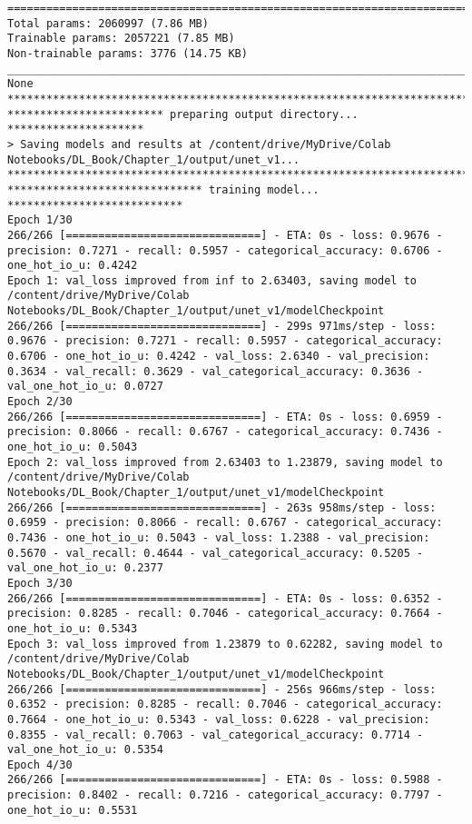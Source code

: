 \documentclass[
  letterpaper,
  DIV=11,
  numbers=noendperiod]{scrreprt}
\begin{document}
\begin{verbatim}
==================================================================================================
Total params: 2060997 (7.86 MB)
Trainable params: 2057221 (7.85 MB)
Non-trainable params: 3776 (14.75 KB)
__________________________________________________________________________________________________
None
****************************************************************************
************************ preparing output directory... *********************
> Saving models and results at /content/drive/MyDrive/Colab Notebooks/DL_Book/Chapter_1/output/unet_v1...
****************************************************************************
****************************** training model... ***************************
Epoch 1/30
266/266 [==============================] - ETA: 0s - loss: 0.9676 - precision: 0.7271 - recall: 0.5957 - categorical_accuracy: 0.6706 - one_hot_io_u: 0.4242
Epoch 1: val_loss improved from inf to 2.63403, saving model to /content/drive/MyDrive/Colab Notebooks/DL_Book/Chapter_1/output/unet_v1/modelCheckpoint
266/266 [==============================] - 299s 971ms/step - loss: 0.9676 - precision: 0.7271 - recall: 0.5957 - categorical_accuracy: 0.6706 - one_hot_io_u: 0.4242 - val_loss: 2.6340 - val_precision: 0.3634 - val_recall: 0.3629 - val_categorical_accuracy: 0.3636 - val_one_hot_io_u: 0.0727
Epoch 2/30
266/266 [==============================] - ETA: 0s - loss: 0.6959 - precision: 0.8066 - recall: 0.6767 - categorical_accuracy: 0.7436 - one_hot_io_u: 0.5043
Epoch 2: val_loss improved from 2.63403 to 1.23879, saving model to /content/drive/MyDrive/Colab Notebooks/DL_Book/Chapter_1/output/unet_v1/modelCheckpoint
266/266 [==============================] - 263s 958ms/step - loss: 0.6959 - precision: 0.8066 - recall: 0.6767 - categorical_accuracy: 0.7436 - one_hot_io_u: 0.5043 - val_loss: 1.2388 - val_precision: 0.5670 - val_recall: 0.4644 - val_categorical_accuracy: 0.5205 - val_one_hot_io_u: 0.2377
Epoch 3/30
266/266 [==============================] - ETA: 0s - loss: 0.6352 - precision: 0.8285 - recall: 0.7046 - categorical_accuracy: 0.7664 - one_hot_io_u: 0.5343
Epoch 3: val_loss improved from 1.23879 to 0.62282, saving model to /content/drive/MyDrive/Colab Notebooks/DL_Book/Chapter_1/output/unet_v1/modelCheckpoint
266/266 [==============================] - 256s 966ms/step - loss: 0.6352 - precision: 0.8285 - recall: 0.7046 - categorical_accuracy: 0.7664 - one_hot_io_u: 0.5343 - val_loss: 0.6228 - val_precision: 0.8355 - val_recall: 0.7063 - val_categorical_accuracy: 0.7714 - val_one_hot_io_u: 0.5354
Epoch 4/30
266/266 [==============================] - ETA: 0s - loss: 0.5988 - precision: 0.8402 - recall: 0.7216 - categorical_accuracy: 0.7797 - one_hot_io_u: 0.5531

\end{verbatim}
\end{document}

